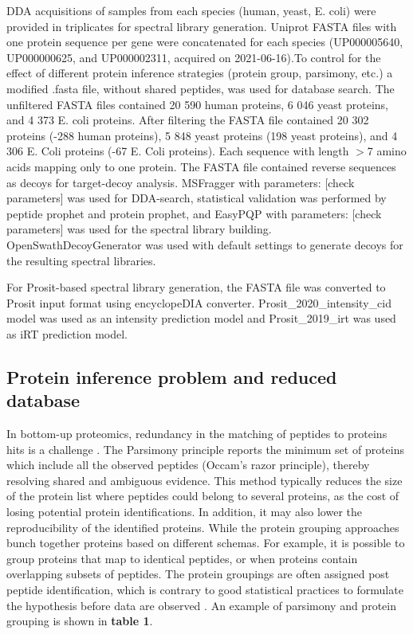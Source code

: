 \documentclass[10pt,letterpaper]{article}
\begin{document}
{DDA acquisitions of samples from each species (human, yeast, E. coli) were provided in triplicates for spectral library generation. Uniprot FASTA files with one protein sequence per gene were concatenated for each species (UP000005640, UP000000625, and UP000002311, acquired on 2021-06-16).To control for the effect of different protein inference strategies (protein group, parsimony, etc.) a modified .fasta file, without shared peptides, was used for database search. The unfiltered FASTA files contained 20 590 human proteins, 6 046 yeast proteins, and 4 373 E. coli proteins. After filtering the FASTA file contained 20 302 proteins (-288 human proteins), 5 848 yeast proteins (198 yeast proteins), and 4 306 E. Coli proteins (-67 E. Coli proteins). Each sequence with length $>$7 amino acids mapping only to one protein. The FASTA file contained reverse sequences as decoys for target-decoy analysis. MSFragger with parameters: [check parameters] was used for DDA-search, statistical validation was performed by peptide prophet and protein prophet, and EasyPQP with parameters: [check parameters] was used for the spectral library building. OpenSwathDecoyGenerator was used with default settings to generate decoys for the resulting spectral libraries.  

For Prosit-based spectral library generation, the FASTA file was converted to Prosit input format using encyclopeDIA converter. Prosit\_2020\_intensity\_cid model was used as an intensity prediction model and Prosit\_2019\_irt was used as iRT prediction model.  


\subsection*{Protein inference problem and reduced database}

In bottom-up proteomics, redundancy in the matching of peptides to proteins hits is a challenge \cite{nesvizhskii2005interpretation}. The Parsimony principle reports the minimum set of proteins which include all the observed peptides (Occam's razor principle), thereby resolving shared and ambiguous evidence. This method typically reduces the size of the protein list where peptides could belong to several proteins, as the cost of losing potential protein identifications. In addition, it may also lower the reproducibility of the identified proteins\cite{serang2012recognizing}. While the protein grouping approaches bunch together proteins based on different schemas. For example, it is possible to group proteins that map to identical peptides, or when proteins contain overlapping subsets of peptides. The protein groupings are often assigned post peptide identification, which is contrary to good statistical practices to formulate the hypothesis before data are observed \cite{serang2012recognizing}. An example of parsimony and protein grouping is shown in \textbf{table 1}. 


}
\end{document}
